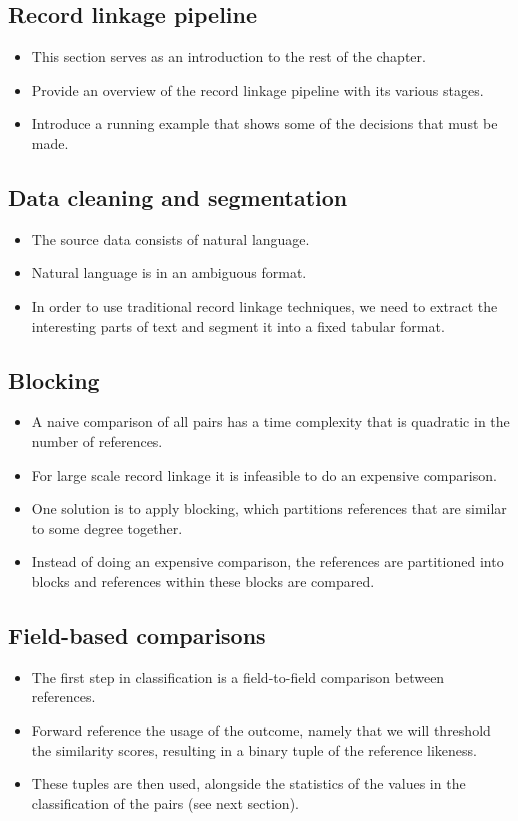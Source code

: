 \documentclass[paper=a4, fontsize=11pt]{scrartcl}
\begin{document}
\subsection{Record linkage pipeline}
\begin{itemize}
    \item This section serves as an introduction to the rest of the chapter.
    \item Provide an overview of the record linkage pipeline with its various stages.
    \item Introduce a running example that shows some of the decisions that must be made.
\end{itemize}

\subsection{Data cleaning and segmentation}
\begin{itemize}
    \item The source data consists of natural language.
    \item Natural language is in an ambiguous format.
    \item In order to use traditional record linkage techniques, we need to extract the interesting parts of text and segment it into a fixed tabular format.
\end{itemize}

\subsection{Blocking}
\begin{itemize}
    \item A naive comparison of all pairs has a time complexity that is quadratic in the number of references.
    \item For large scale record linkage it is infeasible to do an expensive comparison.
    \item One solution is to apply blocking, which partitions references that are similar to some degree together.
    \item Instead of doing an expensive comparison, the references are partitioned into blocks and references within these blocks are compared.
\end{itemize}

\subsection{Field-based comparisons}
\begin{itemize}
    \item The first step in classification is a field-to-field comparison between references.
    \item Forward reference the usage of the outcome, namely that we will threshold the similarity scores, resulting in a binary tuple of the reference likeness.
    \item These tuples are then used, alongside the statistics of the values in the classification of the pairs (see next section).
\end{itemize}
\end{document}
